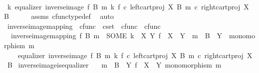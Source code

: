 \begin{isabellebody}
\ \ \isamarkupfalse%
\ \isamarkupfalse%
\ {\isachardoublequoteopen}{\isasymexists}k{\isachardot}{\kern0pt}\ equalizer\ {\isacharparenleft}{\kern0pt}inverse{\isacharunderscore}{\kern0pt}image\ f\ B\ m{\isacharparenright}{\kern0pt}\ k\ {\isacharparenleft}{\kern0pt}f\ {\isasymcirc}\isactrlsub c\ left{\isacharunderscore}{\kern0pt}cart{\isacharunderscore}{\kern0pt}proj\ X\ B{\isacharparenright}{\kern0pt}\ {\isacharparenleft}{\kern0pt}m\ {\isasymcirc}\isactrlsub c\ right{\isacharunderscore}{\kern0pt}cart{\isacharunderscore}{\kern0pt}proj\ X\ B{\isacharparenright}{\kern0pt}{\isachardoublequoteclose}\isanewline
\ \ \ \ \isamarkupfalse%
\ assms{\isacharparenleft}{\kern0pt}{}{\isacharparenright}{\kern0pt}\ cfunc{\isacharunderscore}{\kern0pt}type{\isacharunderscore}{\kern0pt}def\ \isamarkupfalse%
\ auto\isanewline
{}\isamarkupfalse%
%
\endisatagproof
{\isafoldproof}%
%
\isadelimproof
\isanewline
%
\endisadelimproof
\isanewline
{}\isamarkupfalse%
\ inverse{\isacharunderscore}{\kern0pt}image{\isacharunderscore}{\kern0pt}mapping\ {\isacharcolon}{\kern0pt}{\isacharcolon}{\kern0pt}\ {\isachardoublequoteopen}cfunc\ {\isasymRightarrow}\ cset\ {\isasymRightarrow}\ cfunc\ {\isasymRightarrow}\ cfunc{\isachardoublequoteclose}\ \ \isanewline
\ \ {\isachardoublequoteopen}inverse{\isacharunderscore}{\kern0pt}image{\isacharunderscore}{\kern0pt}mapping\ f\ B\ m\ {\isacharequal}{\kern0pt}\ {\isacharparenleft}{\kern0pt}SOME\ k{\isachardot}{\kern0pt}\ {\isasymexists}\ X\ Y{\isachardot}{\kern0pt}\ f\ {\isacharcolon}{\kern0pt}\ X\ {\isasymrightarrow}\ Y\ {\isasymand}\ m\ {\isacharcolon}{\kern0pt}\ B\ {\isasymrightarrow}\ Y\ {\isasymand}\ monomorphism\ m\ {\isasymand}\isanewline
\ \ \ \ equalizer\ {\isacharparenleft}{\kern0pt}inverse{\isacharunderscore}{\kern0pt}image\ f\ B\ m{\isacharparenright}{\kern0pt}\ k\ {\isacharparenleft}{\kern0pt}f\ {\isasymcirc}\isactrlsub c\ left{\isacharunderscore}{\kern0pt}cart{\isacharunderscore}{\kern0pt}proj\ X\ B{\isacharparenright}{\kern0pt}\ {\isacharparenleft}{\kern0pt}m\ {\isasymcirc}\isactrlsub c\ right{\isacharunderscore}{\kern0pt}cart{\isacharunderscore}{\kern0pt}proj\ X\ B{\isacharparenright}{\kern0pt}{\isacharparenright}{\kern0pt}{\isachardoublequoteclose}\isanewline
\isanewline
{}\isamarkupfalse%
\ inverse{\isacharunderscore}{\kern0pt}image{\isacharunderscore}{\kern0pt}is{\isacharunderscore}{\kern0pt}equalizer{}{\isacharcolon}{\kern0pt}\isanewline
\ \ \ {\isachardoublequoteopen}m\ {\isacharcolon}{\kern0pt}\ B\ {\isasymrightarrow}\ Y{\isachardoublequoteclose}\ {\isachardoublequoteopen}f\ {\isacharcolon}{\kern0pt}\ X\ {\isasymrightarrow}\ Y{\isachardoublequoteclose}\ {\isachardoublequoteopen}monomorphism\ m{\isachardoublequoteclose}\isanewline

\end{isabellebody}
